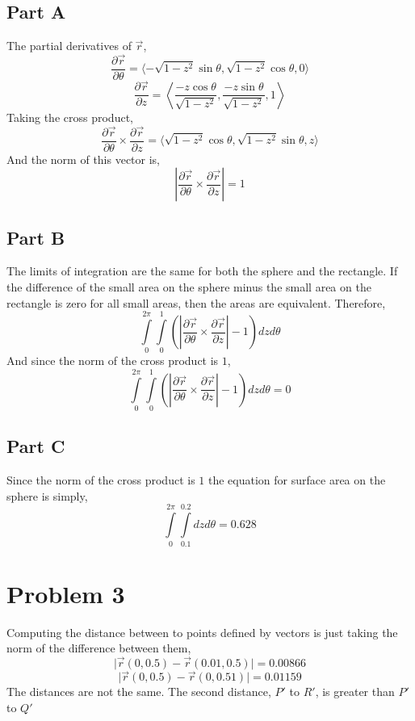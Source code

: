 \documentclass{article}
\begin{document}
\subsection*{Part A}

The partial derivatives of $\vec{r}$,
$$ \frac{\partial \vec{r}}{\partial \theta} = \langle -\sqrt{1 - z^2} \sin
\theta, \sqrt{1 - z^2} \cos \theta, 0 \rangle $$
$$ \frac{\partial \vec{r}}{\partial z} = \left\langle \frac{-z \cos
\theta}{\sqrt{1 - z^2}}, \frac{-z \sin \theta}{\sqrt{1 - z^2}}, 1
\right\rangle $$
Taking the cross product,
$$ \frac{\partial \vec{r}}{\partial \theta} \times \frac{\partial
\vec{r}}{\partial z} = \langle \sqrt{1 - z^2} \cos \theta, \sqrt{1 - z^2} \sin
\theta, z \rangle $$
And the norm of this vector is,
$$ \left\vert \frac{\partial \vec{r}}{\partial \theta} \times \frac{\partial
\vec{r}}{\partial z} \right\vert = 1 $$

\subsection*{Part B}

The limits of integration are the same for both the sphere and the rectangle. If
the difference of the small area on the sphere minus the small area on the
rectangle is zero for all small areas, then the areas are equivalent. Therefore,
$$ \int\limits_0^{2\pi}\int\limits_0^{1} \left( \left\vert \frac{\partial
\vec{r}}{\partial \theta} \times \frac{\partial \vec{r}}{\partial z} \right\vert
- 1\right) dz d\theta $$
And since the norm of the cross product is $1$,
$$ \int\limits_0^{2\pi}\int\limits_0^{1} \left( \left\vert \frac{\partial
\vec{r}}{\partial \theta} \times \frac{\partial \vec{r}}{\partial z} \right\vert
- 1\right) dz d\theta = 0 $$

\subsection*{Part C}

Since the norm of the cross product is $1$ the equation for surface area on the
sphere is simply,
$$ \int\limits_0^{2\pi}\int\limits_{0.1}^{0.2} dz d\theta = 0.628 $$

\section*{Problem 3}

Computing the distance between to points defined by vectors is just taking the
norm of the difference between them,
$$ \vert \vec{r}(0, 0.5) - \vec{r}(0.01, 0.5) \vert = 0.00866 $$
$$ \vert \vec{r}(0, 0.5) - \vec{r}(0,0.51) \vert = 0.01159 $$
The distances are not the same. The second distance, $P'$ to $R'$, is greater
than $P'$ to $Q'$
\end{document}
